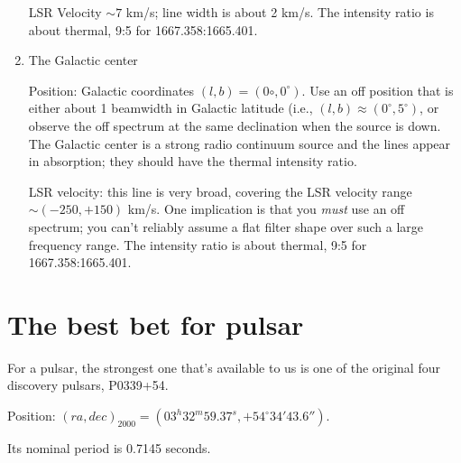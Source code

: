 \documentclass[11pt,preprint]{aastex}
\begin{document}
\begin{enumerate}
LSR Velocity $\sim 7$ km/s; line width is about 2 km/s. The intensity
ratio is about thermal, 9:5 for 1667.358:1665.401.

\item The Galactic center

Position: Galactic coordinates $(l,b) = (0\circ, 0^\circ)$. Use an off
position that is either about 1 beamwidth in Galactic latitude (i.e.,
$(l,b) \approx (0^\circ, 5^\circ)$, or observe the off
spectrum at the same declination when the source is down.  The Galactic
center is a strong radio continuum source and the lines appear in
absorption; they should have the thermal intensity ratio.

LSR velocity: this line is very broad, covering the LSR velocity range
$\sim (-250, +150)$ km/s.  One implication is that you {\it must} use an off
spectrum; you can't reliably assume a flat filter shape over such a
large frequency range. The intensity
ratio is about thermal, 9:5 for 1667.358:1665.401.

\end{enumerate}

\section{The best bet for pulsar}

For a pulsar, the strongest one that's available to us is one of the
original four discovery pulsars, P0339+54.

Position: $(ra, dec)_{2000} =  (03^h32^m59.37^s, +54^\circ 34' 43.6'')$. 

Its nominal period is 0.7145 seconds.
\end{document}

